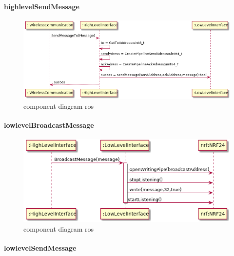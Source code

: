 \documentclass[a4paper, 11pt, oneside]{report}
\begin{document}
\paragraph{highlevelSendMessage}
\label{DetailedDesign:NRF24:sequence:highlevelSendMessage}

\begin{figure}[H]
	\begin{center}\includegraphics[width=1\linewidth]{UML/out/NRF24/sequence/highlevelSendMessage/highlevelSendMessage.png}\end{center}
	\caption{component diagram ros}
	\label{fig:NRF24:sequence:highlevelSendMessage}
\end{figure}

\paragraph{lowlevelBroadcastMessage}
\label{DetailedDesign:NRF24:sequence:lowlevelBroadcastMessage}

\begin{figure}[H]
	\begin{center}\includegraphics[width=1\linewidth]{UML/out/NRF24/sequence/lowlevelBroadcastMessage/lowlevelBroadcastMessage.png}\end{center}
	\caption{component diagram ros}
	\label{fig:NRF24:sequence:lowlevelBroadcastMessage}
\end{figure}

\paragraph{lowlevelSendMessage}
\label{DetailedDesign:NRF24:sequence:lowlevelSendMessage}
\end{document}
